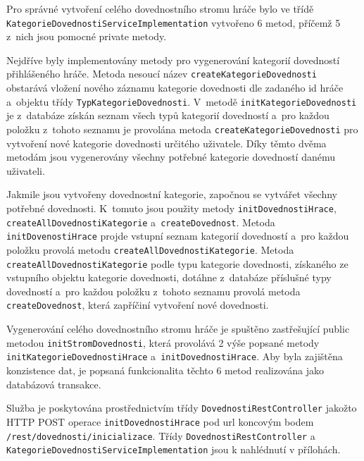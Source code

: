 \documentclass[twoside, 12pt]{article}
\begin{document}
{\clearpage

\obrazek
{}

Pro správné vytvoření celého dovednostního stromu hráče bylo ve třídě \texttt{KategorieDovednostiServiceImplementation} vytvořeno 6 metod,
příčemž 5 z~nich jsou pomocné private metody.

Nejdříve byly implementovány metody pro vygenerování kategorií dovedností přihlášeného hráče.
Metoda nesoucí název \texttt{createKategorieDovednosti} obstarává vložení nového záznamu kategorie dovednosti dle zadaného id hráče a~objektu třídy
\texttt{TypKategorieDovednosti}.
V~metodě \texttt{initKategorieDovednosti} je z~databáze získán seznam všech typů kategorií dovedností
a~pro každou položku z~tohoto seznamu je provolána metoda \texttt{createKategorieDovednosti}
pro vytvoření nové kategorie dovednosti určitého uživatele.
Díky těmto dvěma metodám jsou vygenerovány všechny potřebné kategorie dovedností danému uživateli.

Jakmile jsou vytvořeny dovednostní kategorie, započnou se vytvářet všechny potřebné dovednosti.
K~tomuto jsou použity metody \texttt{initDovednostiHrace}, \texttt{createAllDovednostiKategorie} a~\texttt{createDovednost}.
Metoda \texttt{initDovenostiHrace} projde vstupní seznam kategorií dovedností
a~pro každou položku provolá metodu \texttt{createAllDovednostiKategorie}.
Metoda \texttt{createAllDovednostiKategorie}  podle typu kategorie dovednosti,
získaného ze vstupního objektu kategorie dovednosti,
dotáhne z~databáze příslušné typy dovedností a~pro každou položku z~tohoto seznamu provolá metoda \texttt{createDovednost},
která zapříčiní vytvoření nové dovednosti.

Vygenerování celého dovednostního stromu hráče je spuštěno zastřešující public metodou \texttt{initStromDovednosti},
která provolává 2 výše popsané metody \texttt{initKategorieDovednostiHrace} a~\texttt{initDovednostiHrace}.
Aby byla zajištěna konzistence dat, je popsaná funkcionalita těchto 6 metod realizována jako databázová transakce.

Služba je poskytována prostřednictvím třídy \texttt{DovednostiRestController}
jakožto HTTP POST operace \texttt{initDovednostiHrace}
pod url koncovým bodem \texttt{/rest/dovednosti/inicializace}.
Třídy \texttt{DovednostiRestController} a \texttt{KategorieDovednostiServiceImplementation} jsou k nahlédnutí v přílohách.

}
\end{document}
